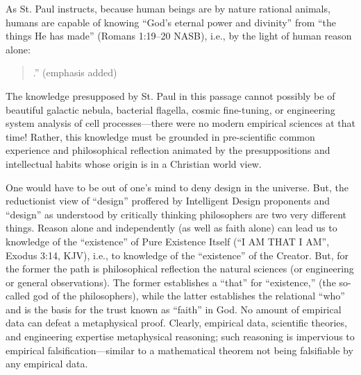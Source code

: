As St. Paul instructs, because human beings are by nature rational animals, humans are capable of knowing ``God's eternal power and divinity'' from ``the things He has made'' (Romans 1:19--20 NASB), i.e., by the light of human reason alone:

\begin{quote}
.'' (emphasis added)
\end{quote}

The knowledge presupposed by St. Paul in this passage cannot possibly be of beautiful galactic nebula, bacterial flagella, cosmic fine-tuning, or engineering system analysis of cell processes---there were no modern empirical sciences at that time! Rather, this knowledge must be grounded in pre-scientific common experience and philosophical reflection animated by the presuppositions and intellectual habits whose origin is in a Christian world view.

One would have to be out of one's mind to deny design in the universe. But, the reductionist view of ``design'' proffered by Intelligent Design proponents and ``design'' as understood by critically thinking philosophers are two very different things. 
Reason alone and independently (as well as faith alone) can lead us to knowledge of the ``existence'' of Pure Existence Itself (``I AM THAT I AM'', Exodus 3:14, KJV), i.e., to knowledge of the ``existence'' of the Creator. But, for the former the path is  philosophical reflection  the natural sciences (or engineering or general observations). The former establishes a ``that'' for ``existence,'' (the so-called god of the philosophers), while the latter establishes the relational ``who'' and is the basis for the trust known as ``faith'' in  God.
No amount of empirical data can defeat a metaphysical proof. Clearly, empirical data, scientific theories, and engineering expertise  metaphysical reasoning; such reasoning is impervious to empirical falsification---similar to a mathematical theorem not being falsifiable by any empirical data.

